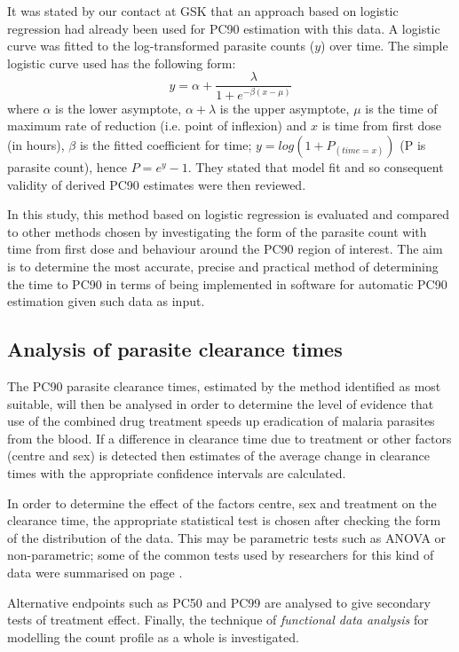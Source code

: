 It was stated by our contact at GSK that an approach based on logistic regression had already been used for PC90 estimation with this data. A logistic curve was fitted to the log-transformed parasite counts ($y$) over time. The simple logistic curve used has the following form: 
$$
y=\alpha+\frac{\lambda}{1+e^{-\beta(x-\mu)}}
$$
where $\alpha$ is the lower asymptote, $\alpha+\lambda$ is the upper asymptote, $\mu$ is the time of maximum rate of reduction (i.e. point of inflexion) and $x$ is time from first dose (in hours), $\beta$ is the fitted coefficient for time; $y = log(1 + P_{(time=x)})$ (P is parasite count), hence $P = e^{y}-1$. They stated that model fit and so consequent validity of derived PC90 estimates were then reviewed.

In this study, this method based on logistic regression is evaluated and compared to other methods chosen by investigating the form of the parasite count with time from first dose and behaviour around the PC90 region of interest. The aim is to determine the most accurate, precise and practical method of determining the time to PC90 in terms of being implemented in software for automatic PC90 estimation given such data as input.

\subsection{Analysis of parasite clearance times}
The PC90 parasite clearance times, estimated by the method identified as most suitable, will then be analysed in order to determine the level of evidence that use of the combined drug treatment speeds up eradication of malaria parasites from the blood. If a difference in clearance time due to treatment or other factors (centre and sex) is detected then estimates of the average change in clearance times with the appropriate confidence intervals are calculated.

In order to determine the effect of the factors centre, sex and treatment on the clearance time, the appropriate statistical test is chosen after checking the form of the distribution of the data. This may be parametric tests such as ANOVA or non-parametric; some of the common tests used by researchers for this kind of data were summarised on page \pageref{stat-tests}.

Alternative endpoints such as PC50 and PC99 are analysed to give secondary tests of treatment effect. Finally, the technique of \emph{functional data analysis} for modelling the count profile as a whole is investigated. 
